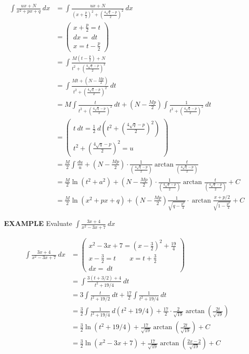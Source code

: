 \documentclass{article}
\begin{document}
\begin{align*}
\int\frac{ux+N}{x^2+px+q}\ dx&=\int\frac{ux+N}{\left(x+\frac{p}{2}\right)^2+\left(\frac{4\sqrt{q}-p}{2}\right)^2}\ dx\\
&=\left(\begin{aligned}x+\frac{p}{2}=t\\dx=\ dt\\x=t-\frac{p}{2}\end{aligned}\right)\\
&=\int\frac{M\left(t-\frac{p}{2}\right)+N}{t^2+\left(\frac{4\sqrt{q}-p}{2}\right)^2}\\
&=\int\frac{Mt+\left(N-\frac{Mp}{2}\right)}{t^2+\left(\frac{4\sqrt{q}-p}{2}\right)^2}\ dt\\
&=M\int\frac{t}{t^2+\left(\frac{4\sqrt{q}-p}{2}\right)^2}\ dt+\left(N-\frac{Mp}{2}\right)\int\frac{1}{t^2+\left(\frac{4\sqrt{q}-p}{2}\right)^2}\ dt\\
&=\left(\begin{aligned}t\ dt=\frac{1}{2}\ d\left(t^2+\left(\frac{4\sqrt{q}-p}{2}\right)^2\right)\\t^2+\left(\frac{4\sqrt{q}-p}{2}\right)^2=u\end{aligned}\right)\\
&=\frac{M}{2}\int\frac{du}{u}+\left(N-\frac{Mp}{2}\right)\cdot\frac{1}{\left(\frac{4\sqrt{q}-p}{2}\right)}\arctan\frac{t}{\left(\frac{4\sqrt{q}-p}{2}\right)}\\
&=\frac{M}{2}\ln(t^2+a^2)+\left(N-\frac{Mp}{2}\right)\cdot\frac{1}{\left(\frac{4\sqrt{q}-p}{2}\right)}\arctan\frac{t}{\left(\frac{4\sqrt{q}-p}{2}\right)}+C\\

&=\frac{M}{2}\ln(x^2+px+q)+\left(N-\frac{Mp}{2}\right)\frac{1}{\sqrt{q-\frac{p^2}{4}}}\cdot\arctan\frac{x+p/2}{\sqrt{1-\frac{p^2}{4}}}+C
\end{align*}

\newpage

{\bf{}EXAMPLE} Evaluate $\displaystyle\int\frac{3x+4}{x^2-3x+7}\ dx$

\vspace{10pt}

\begin{align*}
\int\frac{3x+4}{x^2-3x+7}\ dx&=\left(\begin{aligned}x^2-3x+7=\left(x-\frac{3}{2}\right)^2+\frac{19}{4}\\x-\frac{3}{2}=t\qquad x=t+\frac{3}{2}\\dx=\ dt\end{aligned}\right)\\
&=\int\frac{3(t+3/2)+4}{t^2+19/4}\ dt\\
&=3\int\frac{t}{t^2+19/2}\ dt+\frac{17}{2}\int\frac{1}{t^2+19/4}\ dt\\
&=\frac{3}{2}\int\frac{1}{t^2+19/4}\ d(t^2+19/4)+\frac{17}{2}\cdot\frac{2}{\sqrt{19}}\arctan\left(\frac{2t}{\sqrt{19}}\right)\\
&=\frac{3}{2}\ln(t^2+19/4)+\frac{17}{\sqrt{19}}\arctan\left(\frac{2t}{\sqrt{19}}\right)+C\\
&=\frac{3}{2}\ln(x^2-3x+7)+\frac{17}{\sqrt{19}}\arctan\left(\frac{2x-2}{\sqrt{19}}\right)+C
\end{align*}
\end{document}
